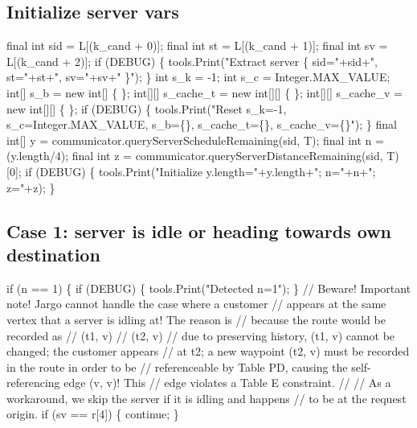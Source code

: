 \subsection{Initialize server vars}
\nwenddocs{}\endmoddef\nwstartdeflinemarkup{}\nwenddeflinemarkup
final int sid = L[(k_cand + 0)];
final int st  = L[(k_cand + 1)];
final int sv  = L[(k_cand + 2)];
if (DEBUG) \{
  tools.Print("Extract server \{ sid="+sid+", st="+st+", sv="+sv+" \}");
\}
int     s_k       = -1;
int     s_c       = Integer.MAX_VALUE;
int[]   s_b       = new int[] \{ \};
int[][] s_cache_t = new int[][] \{ \};
int[][] s_cache_v = new int[][] \{ \};
if (DEBUG) \{
  tools.Print("Reset s_k=-1, s_c=Integer.MAX_VALUE, s_b=\{\}, s_cache_t=\{\}, s_cache_v=\{\}");
\}
final int[] y = communicator.queryServerScheduleRemaining(sid, T);
final int   n = (y.length/4);
final int   z = communicator.queryServerDistanceRemaining(sid, T)[0];
if (DEBUG) \{
  tools.Print("Initialize y.length="+y.length+"; n="+n+"; z="+z);
\}
\nwendcode{}\nwdocspar

\subsection{Case 1: server is idle or heading towards own destination}
\nwenddocs{}\endmoddef\nwstartdeflinemarkup{}\nwenddeflinemarkup
if (n == 1) \{
  if (DEBUG) \{
    tools.Print("Detected n=1");
  \}
  // Beware! Important note! Jargo cannot handle the case where a customer
  // appears at the same vertex that a server is idling at! The reason is
  // because the route would be recorded as
  //   (t1, v)
  //   (t2, v)
  // due to preserving history, (t1, v) cannot be changed; the customer appears
  // at t2; a new waypoint (t2, v) must be recorded in the route in order to be
  // referenceable by Table PD, causing the self-referencing edge (v, v)! This
  // edge violates a Table E constraint.
  //
  // As a workaround, we skip the server if it is idling and happens
  // to be at the request origin.
  if (sv == r[4]) \{
    continue;
  \}

